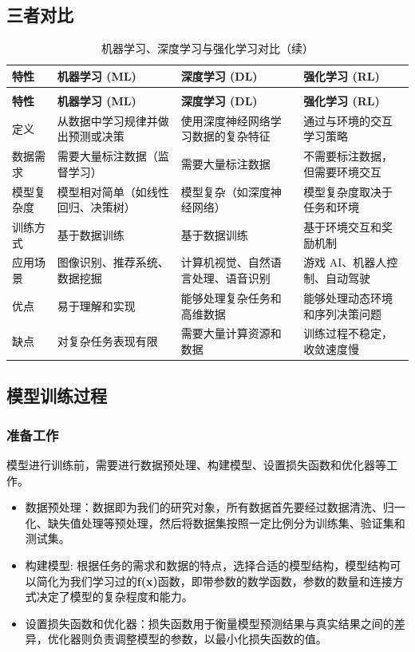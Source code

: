 \documentclass[12pt]{article}
\begin{document}
\subsection{三者对比}
\begin{xltabular}{\textwidth}{XXXX}
\caption{机器学习、深度学习与强化学习对比} \\
\toprule  %
\textbf{特性} & \textbf{机器学习 (ML)} & \textbf{深度学习 (DL)} & \textbf{强化学习 (RL)} \\
\midrule  %
\endfirsthead
\caption[]{机器学习、深度学习与强化学习对比（续）} \\
\toprule
\textbf{特性} & \textbf{机器学习 (ML)} & \textbf{深度学习 (DL)} & \textbf{强化学习 (RL)} \\
\midrule
\endhead
\bottomrule  %
\endfoot
定义 & 从数据中学习规律并做出预测或决策 & 使用深度神经网络学习数据的复杂特征 & 通过与环境的交互学习策略 \\
数据需求 & 需要大量标注数据（监督学习） & 需要大量标注数据 & 不需要标注数据，但需要环境交互 \\
模型复杂度 & 模型相对简单（如线性回归、决策树） & 模型复杂（如深度神经网络） & 模型复杂度取决于任务和环境 \\
训练方式 & 基于数据训练 & 基于数据训练 & 基于环境交互和奖励机制 \\
应用场景 & 图像识别、推荐系统、数据挖掘 & 计算机视觉、自然语言处理、语音识别 & 游戏 AI、机器人控制、自动驾驶 \\
优点 & 易于理解和实现 & 能够处理复杂任务和高维数据 & 能够处理动态环境和序列决策问题 \\
缺点 & 对复杂任务表现有限 & 需要大量计算资源和数据 & 训练过程不稳定，收敛速度慢 \\
\end{xltabular}

\subsection{模型训练过程}
\subsubsection{准备工作}
模型进行训练前，需要进行数据预处理、构建模型、设置损失函数和优化器等工作。
\begin{itemize}
    \item 数据预处理：数据即为我们的研究对象，所有数据首先要经过数据清洗、归一化、缺失值处理等预处理，然后将数据集按照一定比例分为训练集、验证集和测试集。 
    \item 构建模型: 根据任务的需求和数据的特点，选择合适的模型结构，模型结构可以简化为我们学习过的\textbf{f(x)}函数，即带参数的数学函数，参数的数量和连接方式决定了模型的复杂程度和能力。    
    \item 设置损失函数和优化器：损失函数用于衡量模型预测结果与真实结果之间的差异，优化器则负责调整模型的参数，以最小化损失函数的值。
\end{itemize}
\end{document}
